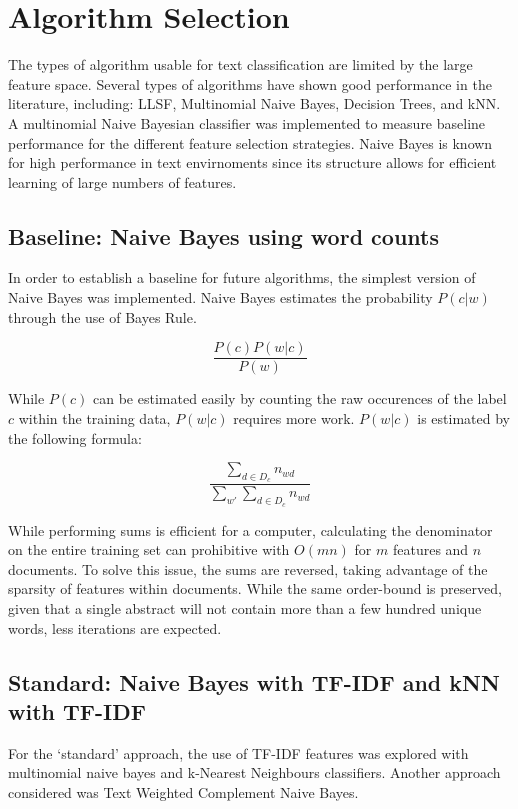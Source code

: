 \documentclass[10pt,twocolumn]{article}
\begin{document}
\section*{Algorithm Selection}

The types of algorithm usable for text classification are limited by the large feature space. Several types of algorithms have shown good performance in the literature, including: LLSF, Multinomial Naive Bayes, Decision Trees, and kNN. A multinomial Naive Bayesian classifier was implemented to measure baseline performance for the different feature selection strategies. Naive Bayes is known for high performance in text envirnoments since its structure allows for efficient learning of large numbers of features.

\subsection*{Baseline: Naive Bayes using word counts}

In order to establish a baseline for future algorithms, the simplest version of Naive Bayes was implemented. Naive Bayes estimates the probability $P(c|w)$ through the use of Bayes Rule.

\[ \frac {P(c)P(w|c)} {P(w)} \]

While $P(c)$ can be estimated easily by counting the raw occurences of the label $c$ within the training data, $P(w|c)$ requires more work. $P(w|c)$ is estimated by the following formula:

\[\frac {\sum_{d \in D_c} n_{wd}} {\sum_{w'} \sum_{d\in D_c} n_{wd}} \]

While performing sums is efficient for a computer, calculating the denominator on the entire training set can prohibitive with $O(mn)$ for $m$ features and $n$ documents. To solve this issue, the sums are reversed, taking advantage of the sparsity of features within documents. While the same order-bound is preserved, given that a single abstract will not contain more than a few hundred unique words, less iterations are expected.

\subsection*{Standard: Naive Bayes with TF-IDF and kNN with TF-IDF}

For the `standard' approach, the use of TF-IDF features was explored with multinomial naive bayes and k-Nearest Neighbours classifiers. Another approach considered was Text Weighted Complement Naive Bayes.
\end{document}
